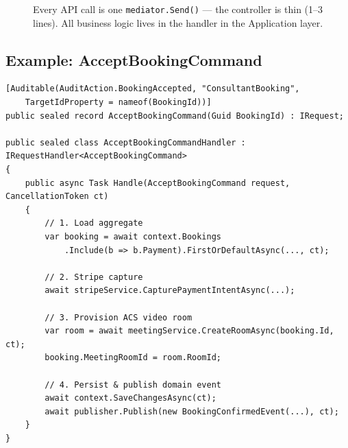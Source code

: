 \documentclass[11pt,a4paper]{article}
\begin{document}
\begin{figure}[H]
\centering
{}
\caption{Every API call is one \texttt{mediator.Send()} --- the controller is
  thin (1--3 lines). All business logic lives in the handler in the Application layer.}
\end{figure}

\subsection{Example: AcceptBookingCommand}

\begin{lstlisting}[language={[Sharp]C},caption={AcceptBookingCommandHandler (condensed)}]
[Auditable(AuditAction.BookingAccepted, "ConsultantBooking",
    TargetIdProperty = nameof(BookingId))]
public sealed record AcceptBookingCommand(Guid BookingId) : IRequest;

public sealed class AcceptBookingCommandHandler : IRequestHandler<AcceptBookingCommand>
{
    public async Task Handle(AcceptBookingCommand request, CancellationToken ct)
    {
        // 1. Load aggregate
        var booking = await context.Bookings
            .Include(b => b.Payment).FirstOrDefaultAsync(..., ct);

        // 2. Stripe capture
        await stripeService.CapturePaymentIntentAsync(...);

        // 3. Provision ACS video room
        var room = await meetingService.CreateRoomAsync(booking.Id, ct);
        booking.MeetingRoomId = room.RoomId;

        // 4. Persist & publish domain event
        await context.SaveChangesAsync(ct);
        await publisher.Publish(new BookingConfirmedEvent(...), ct);
    }
}
\end{lstlisting}
\end{document}
